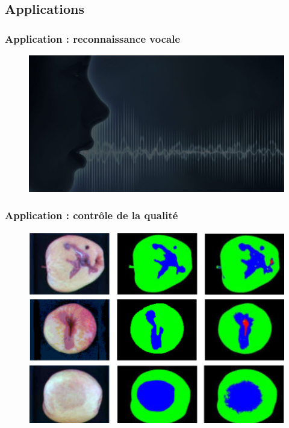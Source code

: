 \documentclass[compress]{beamer}
\begin{document}
\subsection{Applications}
\begin{frame}
	\frametitle{Application : reconnaissance vocale}

	\begin{figure}
		\centering
		\includegraphics[width=1\linewidth]{resources/speech}
	\end{figure}

\end{frame}

\begin{frame}
	\frametitle{Application : contrôle de la qualité}

	\begin{figure}
		\centering
		\includegraphics[width=0.8\linewidth]{resources/quality}
	\end{figure}

\end{frame}
\end{document}
